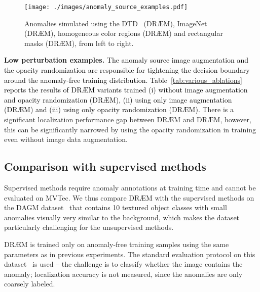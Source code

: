 \documentclass[10pt,twocolumn,letterpaper]{article}
\newcommand\ntext[1]{\textcolor{black}{#1}}
\begin{document}
 
 \begin{figure}
\centering
  \texttt{[image: ./images/anomaly\_source\_examples.pdf]}
\caption{Anomalies simulated using the DTD~\cite{cimpoi2014describing} (DR{\AE}M), ImageNet~\cite{deng2009imagenet} (DR{\AE}M), homogeneous color regions (DR{\AE}M) and rectangular masks (DR{\AE}M), from left to right.}
\label{fig:anom_app}
\end{figure}




\textbf{Low perturbation examples.} \ntext{The anomaly source image augmentation and the opacity randomization are responsible for tightening the decision boundary around the anomaly-free training distribution. Table~\ref{tab:various_ablations} reports the results of DR{\AE}M variants trained (i) 
without image augmentation and opacity randomization (DR{\AE}M), (ii) using only image augmentation (DR{\AE}M) and (iii) using only opacity randomization (DR{\AE}M).}
There is a significant localization performance gap between DR{\AE}M and DR{\AE}M, however, this can be significantly narrowed by using the opacity randomization in training even without image data augmentation. 








\subsection{Comparison with supervised methods}



Supervised methods require anomaly annotations at training time and cannot be evaluated on MVTec. We thus compare DR{\AE}M with the supervised methods on the DAGM dataset~\cite{dagm2007}
that contains 10 textured object classes with small anomalies visually very similar to the background, which makes the dataset particularly challenging for the unsupervised methods.



DR{\AE}M is trained only on anomaly-free training samples using the same parameters as in previous experiments.
The standard evaluation protocol on this dataset~\cite{racki2018, zhang2020, lin2020efficient, bozic2020end} is used -- the challenge is to classify whether the image contains the anomaly; localization accuracy is not measured, since the anomalies are only coarsely labeled.
 


 
\end{document}
